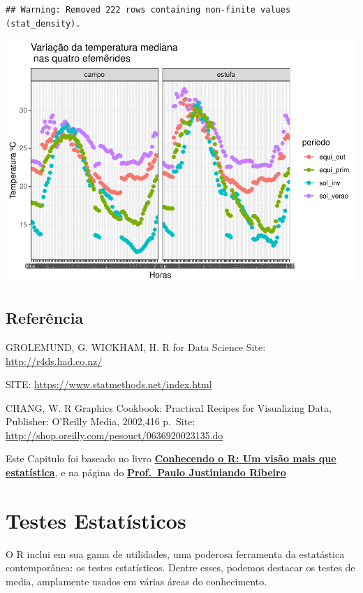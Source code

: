 \documentclass[
]{book}
\begin{document}
\begin{verbatim}
## Warning: Removed 222 rows containing non-finite values (stat_density).
\end{verbatim}

\includegraphics{TudodoR_files/figure-latex/unnamed-chunk-245-1.pdf}

\hypertarget{referuxeancia-3}{%
\section{Referência}\label{referuxeancia-3}}

GROLEMUND, G. WICKHAM, H. R for Data Science Site: \url{http://r4ds.had.co.nz/}

SITE: \url{https://www.statmethods.net/index.html}

CHANG, W. R Graphics Cookbook: Practical Recipes for Visualizing Data, Publisher: O'Reilly Media, 2002,416 p.~Site: \url{http://shop.oreilly.com/pesouct/0636920023135.do}

Este Capitulo foi baseado no livro \href{https://www.editoraufv.com.br/produto/conhecendo-o-r-uma-visao-mais-que-estatistica/1109294}{\textbf{Conhecendo o R: Um visão mais que estatística}}, e na página do \href{http://www.leg.ufpr.br/~paulojus/}{\textbf{Prof.~Paulo Justiniando Ribeiro}}

\hypertarget{testes-estatuxedsticos}{%
\chapter{Testes Estatísticos}\label{testes-estatuxedsticos}}

O R inclui em sua gama de utilidades, uma poderosa ferramenta da estatástica contemporânea: os testes estatísticos. Dentre esses, podemos destacar os testes de media, amplamente usados em várias áreas do conhecimento.
\end{document}
